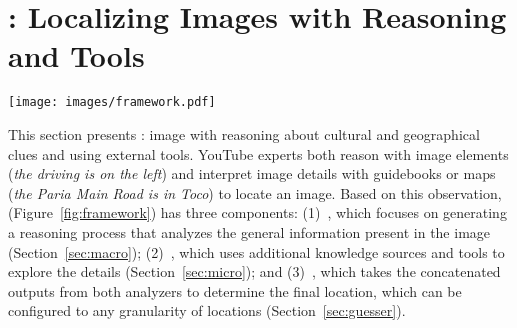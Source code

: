 \section{\modelname: Localizing Images with Reasoning and Tools}
\label{sec:method}

\begin{figure*}[t]
    \centering \texttt{[image: images/framework.pdf]}

\caption{The
    framework of \modelname comprises three main components:
    the \macname, which handles general reasoning; the \micname, which
    leverage external knowledge for detail-specific analysis, and
    the \guessname, which combines outputs from both analyzers to
    generate predictions.}  \label{fig:framework}
\end{figure*}


This section presents \modelname: image \geoloc with reasoning
about cultural and geographical clues and using
external tools. YouTube experts both reason with image elements (\textit{the driving is on the left}) and interpret image details with guidebooks or maps (\textit{the Paria Main Road is in Toco}) to locate an image. Based on this observation, \modelname (Figure~\ref{fig:framework}) has three components: (1)~\textit{\macname}, which focuses on generating a
reasoning process that analyzes the general information present in the
image (Section~\ref{sec:macro}); (2)~\textit{\micname}, which uses
additional knowledge sources and tools to explore the details
(Section~\ref{sec:micro}); and (3)~\textit{\guessname}, which takes
the concatenated outputs from both analyzers to determine the final
location, which can be configured to any granularity of locations
(Section~\ref{sec:guesser}).


